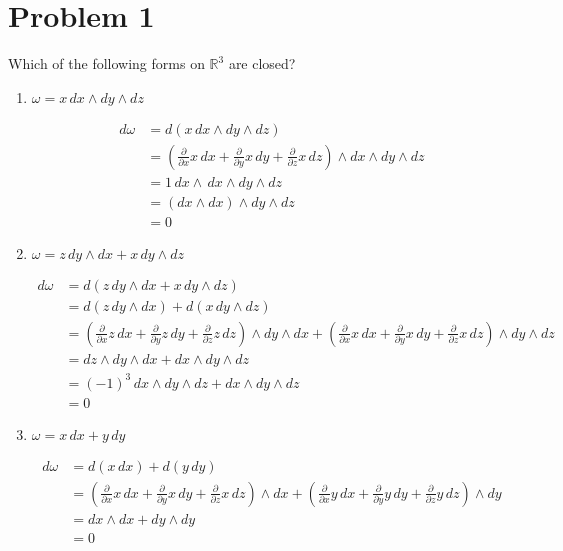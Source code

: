 \documentclass[11pt]{article}
\begin{document}
	
	
	\psetheader
    
    
    \section*{Problem 1}
Which of the following forms on $\mathbb{R}^3$ are closed?
\begin{enumerate}
    \item $\omega = x \, dx \wedge dy \wedge dz$
    \begin{solution}
    \begin{align*}
        d\omega &= d\left(x \, dx \wedge dy \wedge dz\right)\\
        &= \left(\frac{\partial}{\partial x}x\,dx + \frac{\partial}{\partial y}x\,dy + \frac{\partial}{\partial z}x\,dz\right)\wedge dx \wedge dy \wedge dz\\
        &= 1\,dx \wedge\,dx \wedge dy \wedge dz\\
        &= (dx\wedge dx) \wedge dy \wedge dz\\
        &= 0
    \end{align*}
    \end{solution}
    \item $\omega = z \, dy \wedge dx + x \, dy \wedge dz$
\begin{solution}
        \begin{align*}
        d\omega &= d\left(z \, dy \wedge dx + x \, dy \wedge dz\right)\\
        &= d\left(z \, dy \wedge dx\right) + d\left(x\,  dy \wedge dz\right)\\
        &= \left(\frac{\partial}{\partial x}z\,dx + \frac{\partial}{\partial y}z\,dy + \frac{\partial}{\partial z}z\,dz\right)\wedge dy \wedge dx + \left(\frac{\partial}{\partial x}x\,dx + \frac{\partial}{\partial y}x\,dy + \frac{\partial}{\partial z}x\,dz\right)\wedge dy\wedge dz\\
        &= dz\wedge dy\wedge dx + dx \wedge dy \wedge dz\\
        &= (-1)^3 \,dx\wedge dy\wedge dz+ dx\wedge dy\wedge dz\\
        &= 0
    \end{align*}
\end{solution}
    \item $\omega = x \, dx + y \, dy$
\begin{solution}
    \begin{align*}
        d\omega &= d\left( x\,dx\right)  + d(y\,dy)\\
        &= \left(\frac{\partial}{\partial x}x\,dx + \frac{\partial}{\partial y}x\,dy + \frac{\partial}{\partial z}x\,dz\right)\wedge dx + \left(\frac{\partial}{\partial x}y\,dx + \frac{\partial}{\partial y}y\,dy + \frac{\partial}{\partial z}y\,dz\right)\wedge dy\\
        &= dx\wedge dx + dy\wedge dy\\
        &= 0
    \end{align*}
\end{solution}
\end{enumerate}
\end{document}
